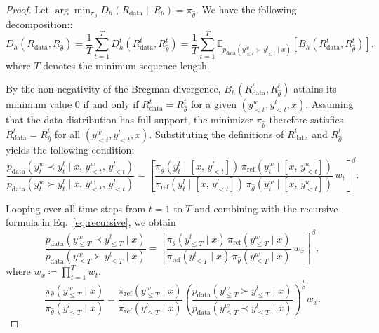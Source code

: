 \documentclass{article}
\theoremstyle{plain}
\theoremstyle{definition}
\theoremstyle{remark}
\begin{document}
\begin{proof}
Let $\arg\min_{\pi_{\theta}} D_h(R_{\mathrm{data}}\|R_{\theta}) = \pi_{\hat{\theta}}$.
We have the following decomposition::
\begin{equation}
D_{h}\left(R_{\text{data}},R_{\hat{\theta}}\right)=\frac{1}{T}\sum_{t=1}^{T}D_{h}^{t}\left(R_{\text{data}}^{t},R_{\hat{\theta}}^{t}\right)
= \frac{1}{T}\sum_{t=1}^{T}\mathbb{E}_{p_{\text{data}}\left(y_{\leq t}^{w}\succ y_{\leq t}^{l}\mid x\right)}\!\left[B_h\!\left(R_{\text{data}}^{t},R_{\hat{\theta}}^{t}\right)\right].
\end{equation}
where $T$ denotes the minimum sequence length.

By the non-negativity of the Bregman divergence,
$B_h\!\left(R_{\text{data}}^{t}, R_{\hat{\theta}}^{t}\right)$
attains its minimum value $0$ if and only if
$R_{\text{data}}^{t} = R_{\hat{\theta}}^{t}$
for a given $(y^w_{<t}, y^l_{<t}, x)$.
Assuming that the data distribution has full support,
the minimizer $\pi_{\hat{\theta}}$ therefore satisfies
$R_{\text{data}}^{t} = R_{\hat{\theta}}^{t}$
for all $(y^w_{<t}, y^l_{<t}, x)$.
Substituting the definitions of
$R_{\text{data}}^{t}$ and $R_{\hat{\theta}}^{t}$
yields the following condition:
\[
\frac{
  p_{\text{data}}\!\left(y_t^{w}\prec y_t^{l}\mid x,\,y_{<t}^{w},\,y_{<t}^{l}\right)
}{
  p_{\text{data}}\!\left(y_t^{w}\succ y_t^{l}\mid x,\,y_{<t}^{w},\,y_{<t}^{l}\right)
}
=
\left[
\frac{
  \pi_{\hat{\theta}}\!\left(y_t^{l}\mid [x,\,y_{<t}^{l}]\right)\,
  \pi_{\mathrm{ref}}\!\left(y_t^{w}\mid [x,\,y_{<t}^{w}]\right)
}{
  \pi_{\mathrm{ref}}\!\left(y_t^{l}\mid [x,\,y_{<t}^{l}]\right)\,
  \pi_{\hat{\theta}}\!\left(y_t^{w}\mid [x,\,y_{<t}^{w}]\right)
}
\, w_t
\right]^{\beta}.
\]

Looping over all time steps from $t=1$ to $T$ and combining with the recursive formula in Eq.~\ref{eq:recursive}, we obtain
\begin{equation*}\label{eq:seq-pref-data}
\frac{
p_{\text{data}}\!\left(y_{\leq T}^{w}\prec y_{\leq T}^{l}\mid x\right)
}{
p_{\text{data}}\!\left(y_{\leq T}^{w}\succ y_{\leq T}^{l}\mid x\right)
}
=
\left[
\frac{
  \pi_{\hat{\theta}}\!\left(y_{\leq T}^{l}\mid x\right)\,
  \pi_{\mathrm{ref}}\!\left(y_{\leq T}^{w}\mid x\right)
}{
  \pi_{\mathrm{ref}}\!\left(y_{\leq T}^{l}\mid x\right)\,
  \pi_{\hat{\theta}}\!\left(y_{\leq T}^{w}\mid x\right)
}
\, w_x
\right]^{\beta},
\end{equation*}
where $w_x \coloneqq \prod_{t=1}^{T} w_t$.
\begin{equation*}\label{eq:seq-ratio-hattheta}
\frac{
   \pi_{\hat{\theta}}\!\left(y_{\leq T}^{w}\mid x\right)
}{
    \pi_{\hat{\theta}}\!\left(y_{\leq T}^{l}\mid x\right)
}
=
\frac{
    \pi_{\mathrm{ref}}\!\left(y_{\leq T}^{w}\mid x\right)
}{
    \pi_{\mathrm{ref}}\!\left(y_{\leq T}^{l}\mid x\right)
}
\left(
\frac{
p_{\text{data}}\!\left(y_{\leq T}^{w}\succ y_{\leq T}^{l}\mid x\right)
}{
p_{\text{data}}\!\left(y_{\leq T}^{w}\prec y_{\leq T}^{l}\mid x\right)
}
\right)^{\frac{1}{\beta}}
w_x .
\end{equation*}



\end{proof}
\end{document}
